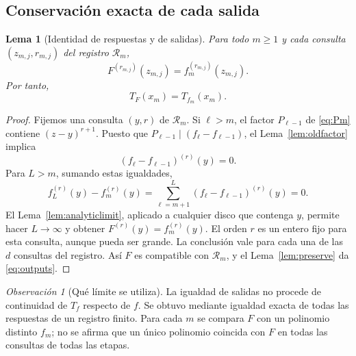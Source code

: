 \documentclass[11pt,a4paper]{article}
\numberwithin{equation}{section}
\newtheorem{lemma}[theorem]{Lema}
\theoremstyle{definition}
\theoremstyle{remark}
\newtheorem{remark}[theorem]{Observación}
\newcommand{\Rec}{\mathcal R}
\begin{document}
\subsection{Conservación exacta de cada salida}
\begin{lemma}[Identidad de respuestas y de salidas]\label{lem:limitrecords}
Para todo $m\ge1$ y cada consulta $(z_{m,j},r_{m,j})$ del registro $\Rec_m$,
\[
F^{(r_{m,j})}(z_{m,j})=f_m^{(r_{m,j})}(z_{m,j}).
\]
Por tanto,
\begin{equation}\label{eq:outputs}
T_F(x_m)=T_{f_m}(x_m).
\end{equation}
\end{lemma}
\begin{proof}
Fijemos una consulta $(y,r)$ de $\Rec_m$. Si $\ell>m$, el factor $P_{\ell-1}$ de \eqref{eq:Pm} contiene $(z-y)^{r+1}$. Puesto que $P_{\ell-1}\mid(f_\ell-f_{\ell-1})$, el Lema~\ref{lem:oldfactor} implica
\[
(f_\ell-f_{\ell-1})^{(r)}(y)=0.
\]
Para $L>m$, sumando estas igualdades,
\[
f_L^{(r)}(y)-f_m^{(r)}(y)
=\sum_{\ell=m+1}^{L}(f_\ell-f_{\ell-1})^{(r)}(y)=0.
\]
El Lema~\ref{lem:analyticlimit}, aplicado a cualquier disco que contenga $y$, permite hacer $L\to\infty$ y obtener $F^{(r)}(y)=f_m^{(r)}(y)$. El orden $r$ es un entero fijo para esta consulta, aunque pueda ser grande. La conclusión vale para cada una de las $d$ consultas del registro. Así $F$ es compatible con $\Rec_m$, y el Lema~\ref{lem:preserve} da \eqref{eq:outputs}.
\end{proof}

\begin{remark}[Qué límite se utiliza]
La igualdad de salidas no procede de continuidad de $T_f$ respecto de $f$. Se obtuvo mediante igualdad exacta de todas las respuestas de un registro finito. Para cada $m$ se compara $F$ con un polinomio distinto $f_m$; no se afirma que un único polinomio coincida con $F$ en todas las consultas de todas las etapas.
\end{remark}
\end{document}
